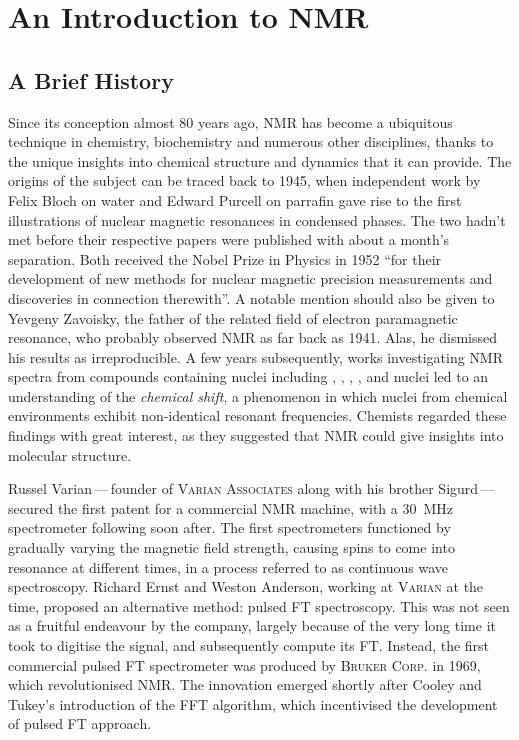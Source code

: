 \section{An Introduction to \acs{NMR}}

\subsection{A Brief History}
Since its conception almost 80 years ago, \ac{NMR} has become a ubiquitous
technique in chemistry, biochemistry and numerous other disciplines, thanks to
the unique insights into chemical structure and dynamics that it
can provide.
The origins of the subject can be traced back to 1945, when independent work by
Felix Bloch on water\cite{Bloch1946} and Edward Purcell on
parrafin\cite{Purcell1946} gave rise to the first illustrations of nuclear
magnetic resonances in condensed phases. The two hadn't met before their
respective papers were published with about a month's
separation\cite{Becker1993}. Both received the Nobel Prize in Physics in 1952
``for their development of new methods for nuclear magnetic precision
measurements and discoveries in connection therewith''\cite{Nobel1952}. A
notable mention should also be given
to Yevgeny Zavoisky, the father of the related field of electron paramagnetic
resonance, who probably observed NMR as far back as 1941\cite{Eaton1998}. Alas,
he dismissed
his results as irreproducible. A few years subsequently, works investigating
\ac{NMR} spectra from compounds containing nuclei including ,
, , , and  nuclei led to an
understanding of the \emph{chemical shift}, a phenomenon in
which nuclei from chemical environments exhibit
non-identical resonant frequencies\cite{Knight1949, Proctor1950,
Dickinson1950}.  Chemists regarded these findings with great
interest, as they suggested that \ac{NMR} could give insights into molecular
structure.

Russel Varian\,---\,founder of \textsc{Varian Associates} along with his brother
Sigurd\,---\,
secured the first patent for a commercial \ac{NMR} machine, with
a \qty{30}{\mega\hertz} spectrometer following soon after. The first
spectrometers functioned by gradually varying the magnetic field strength,
causing spins to come into resonance at different times, in a process referred
to as continuous wave spectroscopy. Richard Ernst and
Weston Anderson, working at \textsc{Varian} at the time, proposed an alternative
method: pulsed \ac{FT} spectroscopy\cite{Ernst1966}. This was not seen as a
fruitful endeavour by the company, largely because of the very long time it
took to digitise the signal, and subsequently compute its FT\cite{Freeman2015}.
Instead, the first commercial pulsed \ac{FT} spectrometer was produced by
\textsc{Bruker Corp.} in 1969, which revolutionised NMR. The innovation emerged
shortly after Cooley and Tukey's introduction of the \ac{FFT}
algorithm\cite{Cooley1965}, which incentivised the development of pulsed
\ac{FT} approach.

